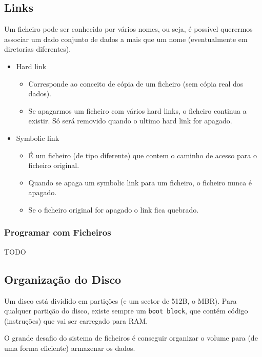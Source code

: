 \documentclass[11pt]{article}
\begin{document}
\subsection{Links}

Um ficheiro pode ser conhecido por vários nomes, ou seja, é possível querermos associar um dado conjunto de dados a mais que um nome (eventualmente em diretorias diferentes).

\begin{itemize}
    \item Hard link
          \begin{itemize}
              \item Corresponde ao conceito de cópia de um ficheiro (sem cópia real dos dados).
              \item Se apagarmos um ficheiro com vários hard links, o ficheiro continua a existir. Só será removido quando o ultimo hard link for apagado.
          \end{itemize}
    \item Symbolic link
    \begin{itemize}
        \item É um ficheiro (de tipo diferente) que contem o caminho de acesso para o ficheiro original.
        \item Quando se apaga um symbolic link para um ficheiro, o ficheiro nunca é apagado.
        \item Se o ficheiro original for apagado o link fica quebrado.
    \end{itemize}
\end{itemize}

\subsubsection{Programar com Ficheiros}

TODO

\subsection{Organização do Disco}

Um disco está dividido em partições (e um sector de 512B, o MBR). Para qualquer partição do disco, existe sempre um \lstinline|boot block|, que contém código (instruções) que vai ser carregado para RAM.

O grande desafio do sistema de ficheiros é conseguir organizar o volume para (de uma forma eficiente) armazenar os dados.
\end{document}
